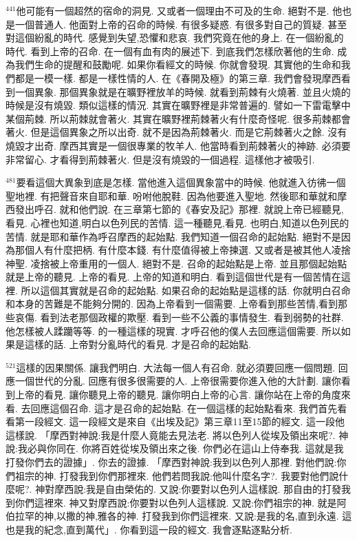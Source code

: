 \documentclass{book}
\begin{document}
$^{441}$他可能有一個超然的宿命的洞見.
又或者一個理由不可及的生命.
絕對不是.
他也是一個普通人.
他面對上帝的召命的時候.
有很多疑惑.
有很多對自己的質疑.
甚至對這個紛亂的時代.
感覺到失望,恐懼和悲哀.
我們究竟在他的身上.
在一個紛亂的時代.
看到上帝的召命.
在一個有血有肉的展述下.
到底我們怎樣欣著他的生命.
成為我們生命的提醒和鼓勵呢.
如果你看經文的時候.
你就會發現.
其實他的生命和我們都是一模一樣.
都是一樣性情的人.
在《春開及極》的第三章.
我們會發現摩西看到一個異象.
那個異象就是在曠野裡放羊的時候.
就看到荊棘有火燒著.
並且火燒的時候是沒有燒毀.
類似這樣的情況.
其實在曠野裡是非常普遍的.
譬如一下雷電擊中某個荊棘.
所以荊棘就會著火.
其實在曠野裡荊棘著火有什麼奇怪呢.
很多荊棘都會著火.
但是這個異象之所以出奇.
就不是因為荊棘著火.
而是它荊棘著火之餘.
沒有燒毀才出奇.
摩西其實是一個很專業的牧羊人.
他當時看到荊棘著火的神跡.
必須要非常留心.
才看得到荊棘著火.
但是沒有燒毀的一個過程.
這樣他才被吸引.

$^{481}$要看這個大異象到底是怎樣.
當他進入這個異象當中的時候.
他就進入彷彿一個聖地裡.
有把聲音來自耶和華.
吩咐他脫鞋.
因為他要進入聖地.
然後耶和華就和摩西發出呼召.
就和他們說.
在三章第七節的《春安及記》那裡.
就說上帝已經聽見,看見.
心裡也知道,明白以色列民的苦情.
這一種聽見,看見.
也明白,知道以色列民的苦情.
就是耶和華作為呼召摩西的起始點.
我們知道一個召命的起始點.
絕對不是因為那個人有什麼把柄.
有什麼本錢.
有什麼值得被上帝揀選.
又或者是被其他人凌捨神聖.
凌捨被上帝重用的一個人.
絕對不是.
召命的起始點是上帝.
並且那個起始點就是上帝的聽見.
上帝的看見.
上帝的知道和明白.
看到這個世代是有一個苦情在這裡.
所以這個其實就是召命的起始點.
如果召命的起始點是這樣的話.
你就明白召命和本身的苦難是不能夠分開的.
因為上帝看到一個需要.
上帝看到那些苦情,看到那些哀傷.
看到法老那個政權的欺壓.
看到一些不公義的事情發生.
看到弱勢的社群.
他怎樣被人蹂躪等等.
的一種這樣的現實.
才呼召他的僕人去回應這個需要.
所以如果是這樣的話.
上帝對分亂時代的看見.
才是召命的起始點.

$^{521}$這樣的因果關係.
讓我們明白.
大法每一個人有召命.
就必須要回應一個問題.
回應一個世代的分亂.
回應有很多很需要的人.
上帝很需要你進入他的大計劃.
讓你看到上帝的看見.
讓你聽見上帝的聽見.
讓你明白上帝的心言.
讓你站在上帝的角度來看.
去回應這個召命.
這才是召命的起始點.
在一個這樣的起始點看來.
我們首先看看第一段經文.
這一段經文是來自《出埃及記》第三章11至15節的經文.
這一段他這樣說.
「摩西對神說:我是什麼人竟能去見法老.
將以色列人從埃及領出來呢?.
神說:我必與你同在.
你將百姓從埃及領出來之後.
你們必在這山上侍奉我.
這就是我打發你們去的證據」.
你去的證據.
「摩西對神說:我到以色列人那裡.
對他們說:你們祖宗的神.
打發我到你們那裡來.
他們若問我說:他叫什麼名字?.
我要對他們說什麼呢?.
神對摩西說:我是自由榮佑的.
又說:你要對以色列人這樣說.
那自由的打發我到你們這裡來.
神又對摩西說:你要對以色列人這樣說.
又說:你們祖宗的神.
就是阿伯拉罕的神,以撒的神,雅各的神.
打發我到你們這裡來.
又說:是我的名,直到永遠.
這也是我的紀念,直到萬代」.
你看到這一段的經文.
我會逐點逐點分析.
\end{document}
